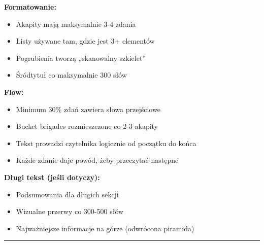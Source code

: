 \documentclass[
  12pt,
  a4paper,
  twoside,
  openright,
  12pt,
  DIV=12,
  BCOR=12mm]{scrbook}
\providecommand{\tightlist}{%
  \setlength{\itemsep}{0pt}\setlength{\parskip}{0pt}}\usepackage{longtable,booktabs,array}
\newcommand{\decoline}{%
  \begin{center}
    \textcolor{bordergray}{\rule{0.3\textwidth}{0.5pt}}
  \end{center}
}
\begin{document}
\textbf{Formatowanie:}

\begin{itemize}
\tightlist
\item[$\square$]
  Akapity mają maksymalnie 3-4 zdania
\item[$\square$]
  Listy używane tam, gdzie jest 3+ elementów
\item[$\square$]
  Pogrubienia tworzą „skanowalny szkielet''
\item[$\square$]
  Śródtytuł co maksymalnie 300 słów
\end{itemize}

\textbf{Flow:}

\begin{itemize}
\tightlist
\item[$\square$]
  Minimum 30\% zdań zawiera słowa przejściowe
\item[$\square$]
  Bucket brigades rozmieszczone co 2-3 akapity
\item[$\square$]
  Tekst prowadzi czytelnika logicznie od początku do końca
\item[$\square$]
  Każde zdanie daje powód, żeby przeczytać następne
\end{itemize}

\textbf{Długi tekst (jeśli dotyczy):}

\begin{itemize}
\tightlist
\item[$\square$]
  Podsumowania dla długich sekcji
\item[$\square$]
  Wizualne przerwy co 300-500 słów
\item[$\square$]
  Najważniejsze informacje na górze (odwrócona piramida)
\end{itemize}

\decoline
\end{document}
